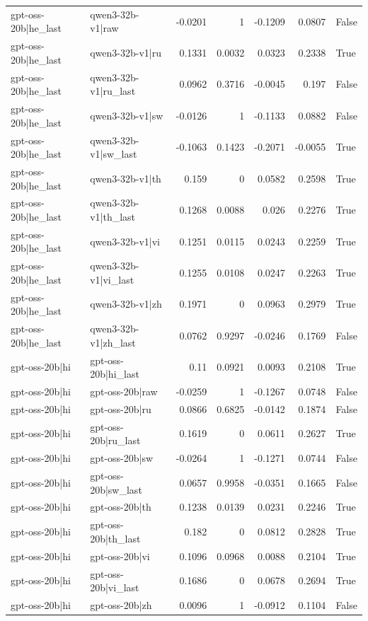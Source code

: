 \begin{table}
\begin{tabular}{l l r r r r l}
gpt-oss-20b|he_last & qwen3-32b-v1|raw & -0.0201 & 1 & -0.1209 & 0.0807 & False \\
gpt-oss-20b|he_last & qwen3-32b-v1|ru & 0.1331 & 0.0032 & 0.0323 & 0.2338 & True \\
gpt-oss-20b|he_last & qwen3-32b-v1|ru_last & 0.0962 & 0.3716 & -0.0045 & 0.197 & False \\
gpt-oss-20b|he_last & qwen3-32b-v1|sw & -0.0126 & 1 & -0.1133 & 0.0882 & False \\
gpt-oss-20b|he_last & qwen3-32b-v1|sw_last & -0.1063 & 0.1423 & -0.2071 & -0.0055 & True \\
gpt-oss-20b|he_last & qwen3-32b-v1|th & 0.159 & 0 & 0.0582 & 0.2598 & True \\
gpt-oss-20b|he_last & qwen3-32b-v1|th_last & 0.1268 & 0.0088 & 0.026 & 0.2276 & True \\
gpt-oss-20b|he_last & qwen3-32b-v1|vi & 0.1251 & 0.0115 & 0.0243 & 0.2259 & True \\
gpt-oss-20b|he_last & qwen3-32b-v1|vi_last & 0.1255 & 0.0108 & 0.0247 & 0.2263 & True \\
gpt-oss-20b|he_last & qwen3-32b-v1|zh & 0.1971 & 0 & 0.0963 & 0.2979 & True \\
gpt-oss-20b|he_last & qwen3-32b-v1|zh_last & 0.0762 & 0.9297 & -0.0246 & 0.1769 & False \\
gpt-oss-20b|hi & gpt-oss-20b|hi_last & 0.11 & 0.0921 & 0.0093 & 0.2108 & True \\
gpt-oss-20b|hi & gpt-oss-20b|raw & -0.0259 & 1 & -0.1267 & 0.0748 & False \\
gpt-oss-20b|hi & gpt-oss-20b|ru & 0.0866 & 0.6825 & -0.0142 & 0.1874 & False \\
gpt-oss-20b|hi & gpt-oss-20b|ru_last & 0.1619 & 0 & 0.0611 & 0.2627 & True \\
gpt-oss-20b|hi & gpt-oss-20b|sw & -0.0264 & 1 & -0.1271 & 0.0744 & False \\
gpt-oss-20b|hi & gpt-oss-20b|sw_last & 0.0657 & 0.9958 & -0.0351 & 0.1665 & False \\
gpt-oss-20b|hi & gpt-oss-20b|th & 0.1238 & 0.0139 & 0.0231 & 0.2246 & True \\
gpt-oss-20b|hi & gpt-oss-20b|th_last & 0.182 & 0 & 0.0812 & 0.2828 & True \\
gpt-oss-20b|hi & gpt-oss-20b|vi & 0.1096 & 0.0968 & 0.0088 & 0.2104 & True \\
gpt-oss-20b|hi & gpt-oss-20b|vi_last & 0.1686 & 0 & 0.0678 & 0.2694 & True \\
gpt-oss-20b|hi & gpt-oss-20b|zh & 0.0096 & 1 & -0.0912 & 0.1104 & False \\

\end{tabular}
\end{table}
